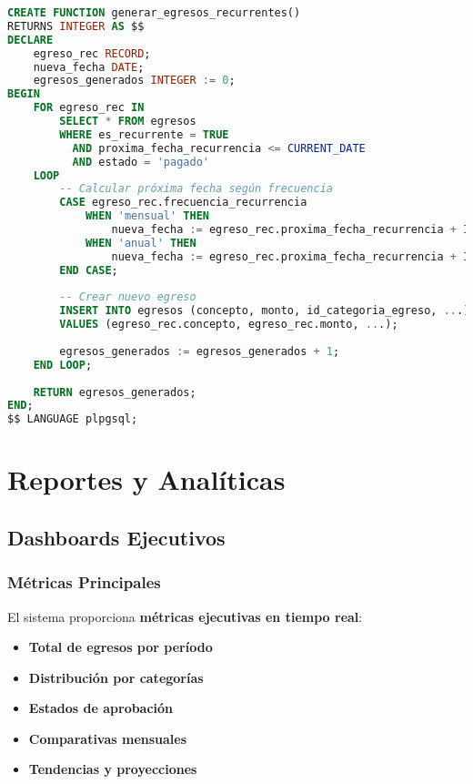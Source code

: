 \documentclass[12pt,a4paper]{article}
\newcommand{\highlight}[1]{\textcolor{primaryblue}{\textbf{#1}}}
\newcommand{\success}[1]{\textcolor{secondarygreen}{\textbf{#1}}}
\begin{document}
\begin{lstlisting}[language=SQL, caption=Función para generar egresos recurrentes]
CREATE FUNCTION generar_egresos_recurrentes()
RETURNS INTEGER AS $$
DECLARE
    egreso_rec RECORD;
    nueva_fecha DATE;
    egresos_generados INTEGER := 0;
BEGIN
    FOR egreso_rec IN 
        SELECT * FROM egresos 
        WHERE es_recurrente = TRUE 
          AND proxima_fecha_recurrencia <= CURRENT_DATE
          AND estado = 'pagado'
    LOOP
        -- Calcular próxima fecha según frecuencia
        CASE egreso_rec.frecuencia_recurrencia
            WHEN 'mensual' THEN 
                nueva_fecha := egreso_rec.proxima_fecha_recurrencia + INTERVAL '1 month';
            WHEN 'anual' THEN 
                nueva_fecha := egreso_rec.proxima_fecha_recurrencia + INTERVAL '1 year';
        END CASE;
        
        -- Crear nuevo egreso
        INSERT INTO egresos (concepto, monto, id_categoria_egreso, ...)
        VALUES (egreso_rec.concepto, egreso_rec.monto, ...);
        
        egresos_generados := egresos_generados + 1;
    END LOOP;
    
    RETURN egresos_generados;
END;
$$ LANGUAGE plpgsql;
\end{lstlisting}


\section{Reportes y Analíticas}

\subsection{Dashboards Ejecutivos}

\subsubsection{Métricas Principales}
El sistema proporciona \highlight{métricas ejecutivas en tiempo real}:

\begin{itemize}[leftmargin=*]
    \item \success{Total de egresos por período}
    \item \success{Distribución por categorías}
    \item \success{Estados de aprobación}
    \item \success{Comparativas mensuales}
    \item \success{Tendencias y proyecciones}
\end{itemize}
\end{document}
